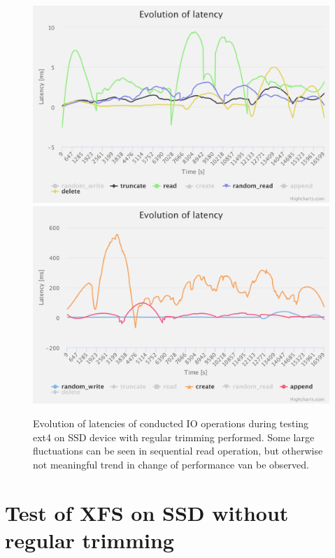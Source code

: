 \documentclass[
  color, %
  table, %
  lof,   %
  lot,   %
]{fithesis3}
\begin{document}
\begin{figure}[!htb]
    \centering
   \begin{minipage}{\textwidth}
        \centering
        \includegraphics[width=\textwidth]{../charts/SSD_ext4_trim/1}
        \includegraphics[width=\textwidth]{../charts/SSD_ext4_trim/2}
                \caption[Evolution of latencies of ext4 during testing on SSD with regular trimming]{Evolution of latencies of conducted IO operations during testing ext4 on SSD device with regular trimming performed. Some large fluctuations can be seen in sequential read operation, but otherwise not meaningful trend in change of performance van be observed.}
\label{fig:lats_ext4_ssd}
    \end{minipage}
\end{figure}

\clearpage


\section{Test of XFS on SSD without regular trimming}
\end{document}
